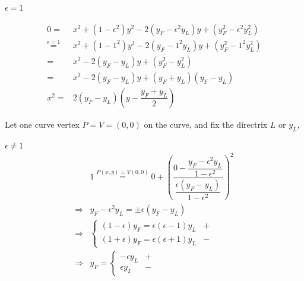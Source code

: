 \documentclass[
]{book}
\theoremstyle{definition}
\theoremstyle{definition}
\theoremstyle{definition}
\theoremstyle{definition}
\theoremstyle{remark}
\begin{document}
\(\epsilon=1\)

\[
\begin{aligned}
0= & x^{2}+\left(1-\epsilon^{2}\right)y^{2}-2\left(y_{{\scriptscriptstyle F}}-\epsilon^{2}y_{{\scriptscriptstyle L}}\right)y+\left(y_{{\scriptscriptstyle F}}^{2}-\epsilon^{2}y_{{\scriptscriptstyle L}}^{2}\right)\\
\overset{\epsilon=1}{=} & x^{2}+\left(1-1^{2}\right)y^{2}-2\left(y_{{\scriptscriptstyle F}}-1^{2}y_{{\scriptscriptstyle L}}\right)y+\left(y_{{\scriptscriptstyle F}}^{2}-1^{2}y_{{\scriptscriptstyle L}}^{2}\right)\\
= & x^{2}-2\left(y_{{\scriptscriptstyle F}}-y_{{\scriptscriptstyle L}}\right)y+\left(y_{{\scriptscriptstyle F}}^{2}-y_{{\scriptscriptstyle L}}^{2}\right)\\
= & x^{2}-2\left(y_{{\scriptscriptstyle F}}-y_{{\scriptscriptstyle L}}\right)y+\left(y_{{\scriptscriptstyle F}}+y_{{\scriptscriptstyle L}}\right)\left(y_{{\scriptscriptstyle F}}-y_{{\scriptscriptstyle L}}\right)\\
x^{2}= & 2\left(y_{{\scriptscriptstyle F}}-y_{{\scriptscriptstyle L}}\right)\left(y-\dfrac{y_{{\scriptscriptstyle F}}+y_{{\scriptscriptstyle L}}}{2}\right)
\end{aligned}
\]

Let one curve vertex \(P=V=\left(0,0\right)\) on the curve, and fix the directrix \(L\) or \(y_{{\scriptscriptstyle L}}\),

\(\epsilon\ne1\) \[
\begin{aligned}
 & 1\overset{P\left(x,y\right)=V\left(0,0\right)}{=}0+\left(\dfrac{0-\dfrac{y_{{\scriptscriptstyle F}}-\epsilon^{2}y_{{\scriptscriptstyle L}}}{1-\epsilon^{2}}}{\dfrac{\epsilon\left(y_{{\scriptscriptstyle F}}-y_{{\scriptscriptstyle L}}\right)}{1-\epsilon^{2}}}\right)^{2}\\
\Rightarrow & y_{{\scriptscriptstyle F}}-\epsilon^{2}y_{{\scriptscriptstyle L}}=\pm\epsilon\left(y_{{\scriptscriptstyle F}}-y_{{\scriptscriptstyle L}}\right)\\
\Rightarrow & \begin{cases}
\left(1-\epsilon\right)y_{{\scriptscriptstyle F}}=\epsilon\left(\epsilon-1\right)y_{{\scriptscriptstyle L}} & +\\
\left(1+\epsilon\right)y_{{\scriptscriptstyle F}}=\epsilon\left(\epsilon+1\right)y_{{\scriptscriptstyle L}} & -
\end{cases}\\
\Rightarrow & y_{{\scriptscriptstyle F}}=\begin{cases}
-\epsilon y_{{\scriptscriptstyle L}} & +\\
\epsilon y_{{\scriptscriptstyle L}} & -
\end{cases}
\end{aligned}
\]
\end{document}
